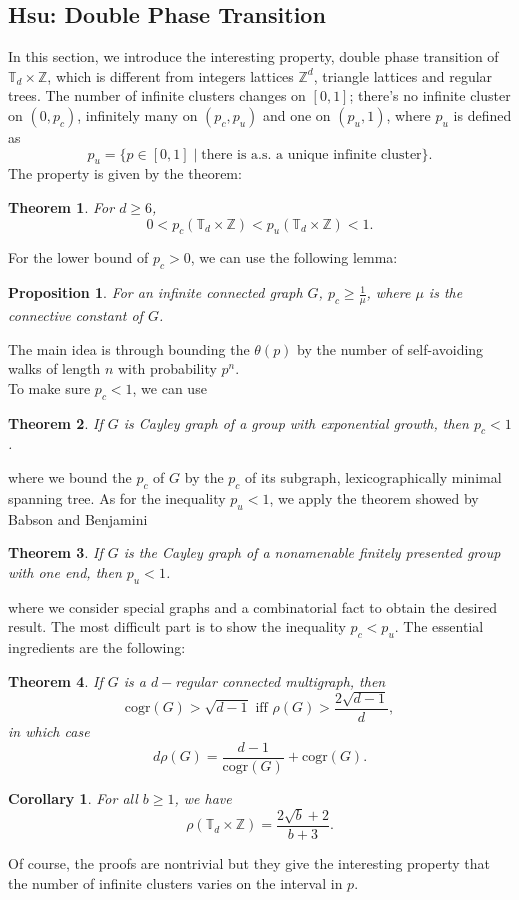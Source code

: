 \documentclass[12pt]{article}
\theoremstyle{plane}
\newtheorem*{thm}{Theorem}
\newtheorem*{cor}{Corollary}
\newtheorem*{prop}{Proposition}
\theoremstyle{definition}
\begin{document}
\subsection*{Hsu: Double Phase Transition}
In this section, we introduce the interesting property, double phase transition of $\mathbb{T}_d\times\mathbb{Z}$, which is different from integers lattices $\mathbb{Z}^d$, triangle lattices and regular trees. The number of infinite clusters changes on $[0,1]$; there's no infinite cluster on $(0,p_c)$, infinitely many on $(p_c,p_u)$ and one on $(p_u,1)$, where $p_u$ is defined as \[p_u=\{p\in [0,1] \mid \text{there is a.s. a unique infinite cluster}\}.\]
The property is given by the theorem:
\begin{thm}
For $d\geq 6$, \[0<p_c(\mathbb{T}_d\times\mathbb{Z})<p_u(\mathbb{T}_d\times\mathbb{Z})<1.\]
\end{thm}
For the lower bound of $p_c>0$, we can use the following lemma:
\begin{prop}
For an infinite connected graph $G$, $p_c\geq\frac{1}{\mu}$, where $\mu$ is the connective constant of $G$.
\end{prop}
The main idea is through bounding the $\theta(p)$ by the number of self-avoiding walks of length $n$ with probability $p^n$.\\To make sure $p_c<1$, 
we can use 
\begin{thm}
If $G$ is Cayley graph of a group with exponential growth, then $p_c<1$.
\end{thm}
where we bound the $p_c$ of $G$ by the $p_c$ of its subgraph, lexicographically minimal spanning tree. As for the inequality $p_u<1$, we apply the theorem showed by Babson and Benjamini
\begin{thm}
If $G$ is the Cayley graph of a nonamenable finitely presented group with one end, then $p_u<1$.
\end{thm}
where we consider special graphs and a combinatorial fact to obtain the desired result. The most difficult part is to show the inequality $p_c<p_u$. The essential ingredients are the following:
\begin{thm}
If $G$ is a $d-$regular connected multigraph, then \[\text{cogr}(G)>\sqrt{d-1} \text{ iff } \rho(G)>\frac{2\sqrt{d-1}}{d},\] in which case \[d\rho(G)=\frac{d-1}{\text{cogr}(G)}+\text{cogr}(G).\]
\end{thm}
\begin{cor}
For all $b\geq 1$, we have \[\rho(\mathbb{T}_d\times\mathbb{Z})=\frac{2\sqrt{b}+2}{b+3}.\]
\end{cor}
Of course, the proofs are nontrivial but they give the interesting property that the number of infinite clusters varies on the interval in $p$. 
\vspace{1cm}
\end{document}
